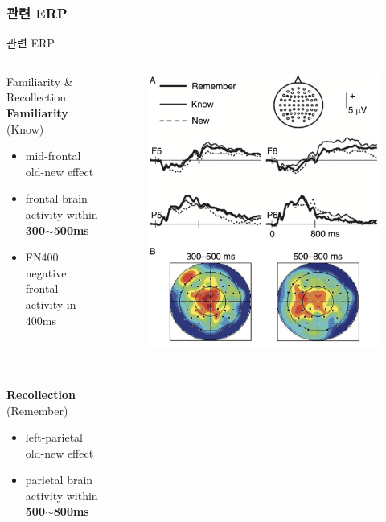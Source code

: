 \documentclass{beamer}
\begin{document}
\subsubsection{관련 ERP}
\begin{frame}{관련 ERP}
  \begin{columns}
    \begin{column}{0.5\textwidth}
      \begin{block}{Familiarity \& Recollection}
        \textbf{Familiarity} (Know)
        \begin{itemize}
          \item mid-frontal old-new effect
          \item frontal brain activity within \textbf{300$\sim$500ms}
          \item FN400: negative frontal activity in 400ms
        \end{itemize}\\~\\~\\
        \textbf{Recollection} (Remember)
        \begin{itemize}
          \item left-parietal old-new effect
          \item parietal brain activity within \textbf{500$\sim$800ms}
        \end{itemize}
      \end{block}
    \end{column}
    \hfill
    \begin{column}{0.48\textwidth}
      \begin{figure}
        \centering
        \includegraphics[width=\textwidth]{image/familiarity_ERP}

\end{figure}
\end{column}
\end{columns}
\end{frame}
\end{document}
